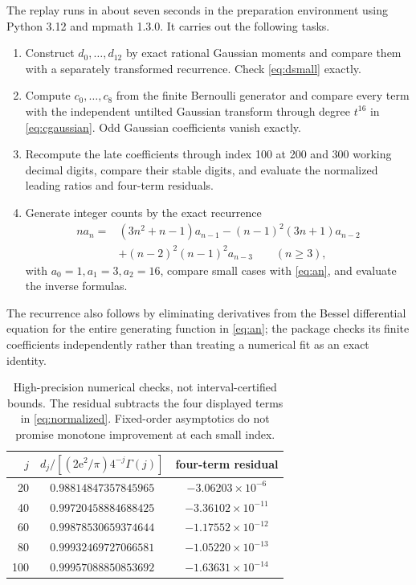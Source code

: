 \documentclass[11pt,letterpaper]{article}
\numberwithin{equation}{section}
\theoremstyle{remark}\newtheorem{remark}[theorem]{Remark}
\newcommand{\e}{\mathrm e}
\begin{document}
The replay runs in about seven seconds in the preparation environment using Python 3.12 and mpmath 1.3.0. It carries out the following tasks.
\begin{enumerate}
\item Construct $d_0,\ldots,d_{12}$ by exact rational Gaussian moments and compare them with a separately transformed recurrence. Check \eqref{eq:dsmall} exactly.
\item Compute $c_0,\ldots,c_8$ from the finite Bernoulli generator and compare every term with the independent untilted Gaussian transform through degree $t^{16}$ in \eqref{eq:cgaussian}. Odd Gaussian coefficients vanish exactly.
\item Recompute the late coefficients through index 100 at 200 and 300 working decimal digits, compare their stable digits, and evaluate the normalized leading ratios and four-term residuals.
\item Generate integer counts by the exact recurrence
\begin{align}\label{eq:arecurrence}
 n a_n={}&(3n^2+n-1)a_{n-1}-(n-1)^2(3n+1)a_{n-2}\nonumber\\
 &+(n-2)^2(n-1)^2a_{n-3}\qquad(n\ge3),
\end{align}
with $a_0=1,a_1=3,a_2=16$, compare small cases with \eqref{eq:an}, and evaluate the inverse formulas.
\end{enumerate}
The recurrence also follows by eliminating derivatives from the Bessel differential equation for the entire generating function in \eqref{eq:an}; the package checks its finite coefficients independently rather than treating a numerical fit as an exact identity.

\begin{table}[ht]
\centering
\begin{tabular}{rcc}
\toprule
$j$ & $d_j/[(2\e^2/\pi)4^{-j}\Gamma(j)]$ & four-term residual\\
\midrule
20 & $0.98814847357845965$ & $-3.06203\times10^{-6}$\\
40 & $0.99720458884688425$ & $-3.36102\times10^{-11}$\\
60 & $0.99878530659374644$ & $-1.17552\times10^{-12}$\\
80 & $0.99932469727066581$ & $-1.05220\times10^{-13}$\\
100& $0.99957088850853692$ & $-1.63631\times10^{-14}$\\
\bottomrule
\end{tabular}
\caption{High-precision numerical checks, not interval-certified bounds. The residual subtracts the four displayed terms in \eqref{eq:normalized}. Fixed-order asymptotics do not promise monotone improvement at each small index.}\label{tab:late}
\end{table}
\end{document}
